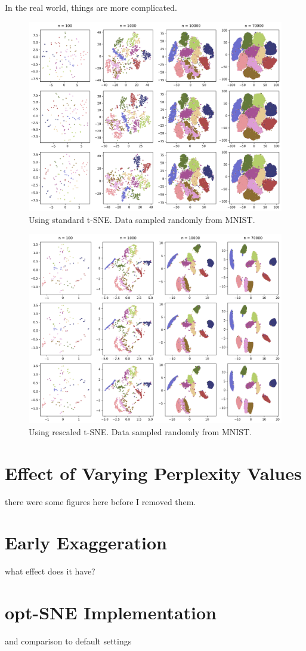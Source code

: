 In the real world, things are more complicated. 

\begin{figure}[h]
    \centering 
        \includegraphics[width=\linewidth]{figures/rescaled/MNIST_standard_embedding_grid.png}
        \caption{Using standard t-SNE. Data sampled randomly from MNIST.}
    \label{fig:MNIST-standard}
\end{figure}

\begin{figure}[h]
    \centering 
        \includegraphics[width=\linewidth]{figures/rescaled/MNIST_rescaled_embedding_grid.png}
        \caption{Using rescaled t-SNE. Data sampled randomly from MNIST.}
    \label{fig:MNIST-rescaled}
\end{figure}

\section{Effect of Varying Perplexity Values}
there were some figures here before I removed them. 

\section{Early Exaggeration}
what effect does it have? 

\section{opt-SNE Implementation}
and comparison to default settings 